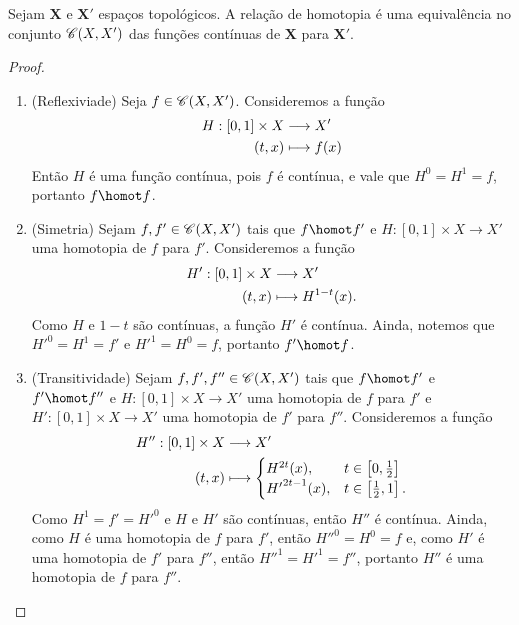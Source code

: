 \begin{prop}
Sejam $\bm X$ e $\bm X'$ espaços topológicos. A relação de homotopia é uma equivalência no conjunto $\mathscr{C}(X,X')$ das funções contínuas de $\bm X$ para $\bm X'$.
\end{prop}
\begin{proof}
	\begin{enumerate}
	\item (Reflexiviade) Seja $f \in \mathscr{C}(X,X')$. Consideremos a função
		\begin{align*}
		{H}: {[0,1] \times X} &\longrightarrow {X'} \\{(t,x)} &\longmapsto {f(x)}
		\end{align*}
Então $H$ é uma função contínua, pois $f$ é contínua, e vale que $H^0 = H^1 = f$, portanto $f \homot f$.
	
	\item (Simetria) Sejam $f,f' \in \mathscr{C}(X,X')$ tais que $f \homot f'$ e $H\colon [0,1] \times X \to X'$ uma homotopia de $f$ para $f'$. Consideremos a função
		\begin{align*}
		{H'}: {[0,1] \times X} &\longrightarrow {X'} \\{(t,x)} &\longmapsto {H^{1-t}(x)}.
		\end{align*}
Como $H$ e $1-t$ são contínuas, a função $H'$ é contínua. Ainda, notemos que ${H'}^0 = H^1 = f'$ e ${H'}^1 = H^0 = f$, portanto $f' \homot f$.

	\item (Transitividade) Sejam $f,f',f'' \in \mathscr{C}(X,X')$ tais que $f \homot f'$ e $f' \homot f''$ e $H\colon [0,1] \times X \to X'$ uma homotopia de $f$ para $f'$ e $H'\colon [0,1] \times X \to X'$ uma homotopia de $f'$ para $f''$. Consideremos a função
		\begin{align*}
		{H''}: {[0,1] \times X} &\longrightarrow {X'} \\{(t,x)} &\longmapsto {
			\begin{cases}
				H^{2t}(x),& t \in \left[0,\frac{1}{2}\right] \\
				{H'}^{2t-1}(x),& t \in \left[\frac{1}{2},1\right].
			\end{cases}
		}
		\end{align*}
Como $H^1 = f' = {H'}^0$ e $H$ e $H'$ são contínuas, então $H''$ é contínua. Ainda, como $H$ é uma homotopia de $f$ para $f'$, então ${H''}^0 = H^0 = f$ e, como $H'$ é uma homotopia de $f'$ para $f''$, então ${H''}^1 = {H'}^1 = f''$, portanto $H''$ é uma homotopia de $f$ para $f''$.
	\end{enumerate}
\end{proof}

